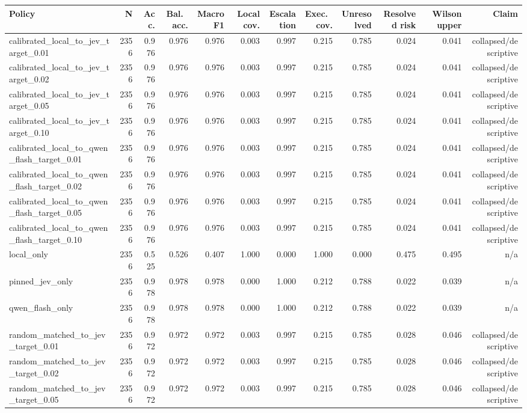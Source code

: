 \begin{tabular}{lrrrrrrrrrrr}
\toprule
Policy & N & Acc. & Bal.\ acc. & Macro F1 & Local cov. & Escalation & Exec.\ cov. & Unresolved & Resolved risk & Wilson upper & Claim \\
\midrule
calibrated\_local\_to\_jev\_target\_0.01 & 2356 & 0.976 & 0.976 & 0.976 & 0.003 & 0.997 & 0.215 & 0.785 & 0.024 & 0.041 & collapsed/descriptive \\
calibrated\_local\_to\_jev\_target\_0.02 & 2356 & 0.976 & 0.976 & 0.976 & 0.003 & 0.997 & 0.215 & 0.785 & 0.024 & 0.041 & collapsed/descriptive \\
calibrated\_local\_to\_jev\_target\_0.05 & 2356 & 0.976 & 0.976 & 0.976 & 0.003 & 0.997 & 0.215 & 0.785 & 0.024 & 0.041 & collapsed/descriptive \\
calibrated\_local\_to\_jev\_target\_0.10 & 2356 & 0.976 & 0.976 & 0.976 & 0.003 & 0.997 & 0.215 & 0.785 & 0.024 & 0.041 & collapsed/descriptive \\
calibrated\_local\_to\_qwen\_flash\_target\_0.01 & 2356 & 0.976 & 0.976 & 0.976 & 0.003 & 0.997 & 0.215 & 0.785 & 0.024 & 0.041 & collapsed/descriptive \\
calibrated\_local\_to\_qwen\_flash\_target\_0.02 & 2356 & 0.976 & 0.976 & 0.976 & 0.003 & 0.997 & 0.215 & 0.785 & 0.024 & 0.041 & collapsed/descriptive \\
calibrated\_local\_to\_qwen\_flash\_target\_0.05 & 2356 & 0.976 & 0.976 & 0.976 & 0.003 & 0.997 & 0.215 & 0.785 & 0.024 & 0.041 & collapsed/descriptive \\
calibrated\_local\_to\_qwen\_flash\_target\_0.10 & 2356 & 0.976 & 0.976 & 0.976 & 0.003 & 0.997 & 0.215 & 0.785 & 0.024 & 0.041 & collapsed/descriptive \\
local\_only & 2356 & 0.525 & 0.526 & 0.407 & 1.000 & 0.000 & 1.000 & 0.000 & 0.475 & 0.495 & n/a \\
pinned\_jev\_only & 2356 & 0.978 & 0.978 & 0.978 & 0.000 & 1.000 & 0.212 & 0.788 & 0.022 & 0.039 & n/a \\
qwen\_flash\_only & 2356 & 0.978 & 0.978 & 0.978 & 0.000 & 1.000 & 0.212 & 0.788 & 0.022 & 0.039 & n/a \\
random\_matched\_to\_jev\_target\_0.01 & 2356 & 0.972 & 0.972 & 0.972 & 0.003 & 0.997 & 0.215 & 0.785 & 0.028 & 0.046 & collapsed/descriptive \\
random\_matched\_to\_jev\_target\_0.02 & 2356 & 0.972 & 0.972 & 0.972 & 0.003 & 0.997 & 0.215 & 0.785 & 0.028 & 0.046 & collapsed/descriptive \\
random\_matched\_to\_jev\_target\_0.05 & 2356 & 0.972 & 0.972 & 0.972 & 0.003 & 0.997 & 0.215 & 0.785 & 0.028 & 0.046 & collapsed/descriptive \\

\end{tabular}
